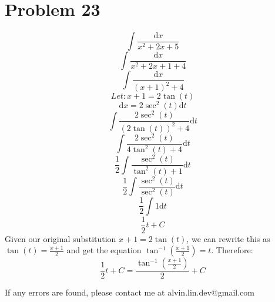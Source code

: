 \documentclass[letterpaper, 12pt]{article}
\renewcommand*{\arctan}{\tan^{-1}}
\newcommand*{\diff}{\mathrm{d}}
\begin{document}
\section*{Problem 23}
\[ \int{\frac{\diff{x}}{x^{2}+2x+5}} \]
\[ \int{\frac{\diff{x}}{x^{2}+2x+1+4}} \]
\[ \int{\frac{\diff{x}}{(x+1)^{2}+4}} \]
\[ Let: x+1 = 2\tan(t) \]
\[ \diff{x} = 2\sec^{2}(t)\diff{t} \]
\[ \int{\frac{2\sec^{2}(t)}{(2\tan(t))^{2}+4}\diff{t}} \]
\[ \int{\frac{2\sec^{2}(t)}{4\tan^{2}(t)+4}\diff{t}} \]
\[ \frac{1}{2}\int{\frac{\sec^{2}(t)}{\tan^{2}(t)+1}\diff{t}} \]
\[ \frac{1}{2}\int{\frac{\sec^{2}(t)}{\sec^{2}(t)}\diff{t}} \]
\[ \frac{1}{2}\int{1\diff{t}} \]
\[ \frac{1}{2}t+C \]
Given our original substitution \( x+1 = 2\tan(t) \), we can rewrite this as
\( \tan(t) = \frac{x+1}{2} \) and get the equation
\( \arctan(\frac{x+1}{2}) = t \).
Therefore:
\[ \frac{1}{2}t+C = \frac{\arctan(\frac{x+1}{2})}{2}+C \]

\begin{center}
  If any errors are found, please contact me at alvin.lin.dev@gmail.com
\end{center}
\end{document}
